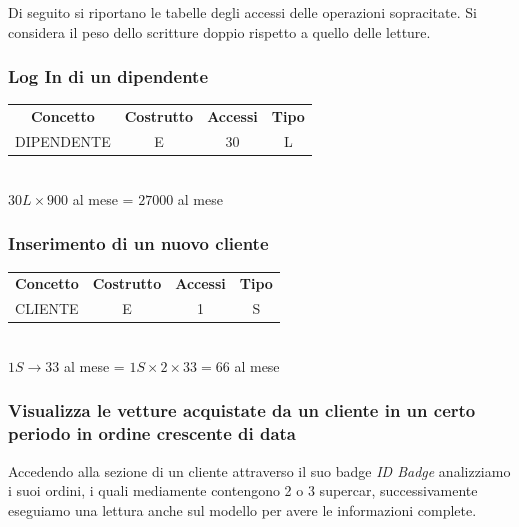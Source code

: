 \documentclass[11pt]{article}
\begin{document}
Di seguito si riportano le tabelle degli accessi delle operazioni sopracitate.
Si considera il peso dello scritture doppio rispetto a quello delle letture.

\subsubsection{Log In di un dipendente}

\begin{table}[H]
    \centering
    \begin{tabular}{ c c c c }
        \rowcolor{red!20!}
        \textbf{Concetto} & \textbf{Costrutto} & \textbf{Accessi} &
        \textbf{Tipo}\\
        DIPENDENTE & E & 30 & L \\
    \end{tabular}\\
    \( 30L \times 900 \) al mese = \( 27000 \) al mese 
\end{table}

\subsubsection{Inserimento di un nuovo cliente}

\begin{table}[H]
    \centering
    \begin{tabular}{ c c c c }
        \rowcolor{red!20!}
        \textbf{Concetto} & \textbf{Costrutto} & \textbf{Accessi} &
        \textbf{Tipo}\\
        CLIENTE & E & 1 & S \\
    \end{tabular}\\
    \( 1S \rightarrow 33 \) al mese = \( 1S \times 2 \times 33 = 66 \) al mese
\end{table}


\subsubsection{Visualizza le vetture acquistate da un cliente in un certo periodo in
ordine crescente di data}

Accedendo alla sezione di un cliente attraverso il suo badge \textit{ID Badge}
analizziamo i suoi ordini, i quali mediamente contengono 2 o 3 supercar,
successivamente eseguiamo una lettura anche sul modello per avere le
informazioni complete.
\end{document}
